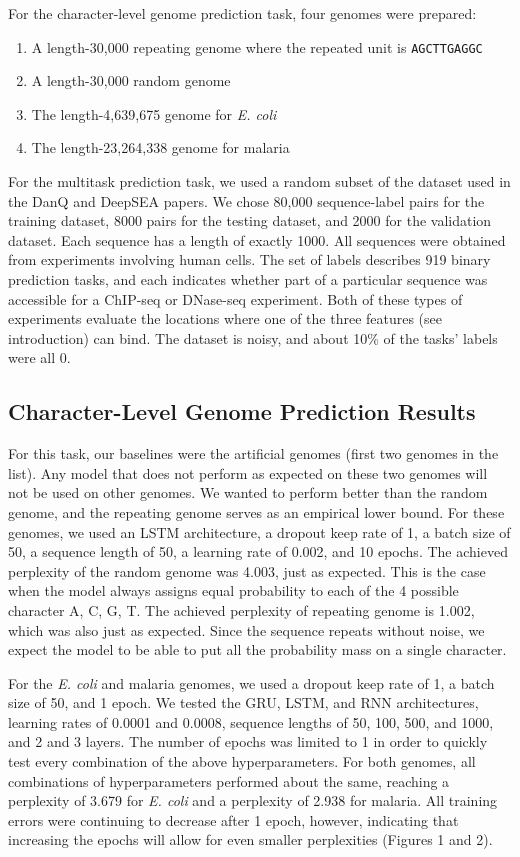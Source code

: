 \documentclass{article} %
\begin{document}
For the character-level genome prediction task, four genomes were prepared:
\begin{enumerate}
	\item A length-30,000 repeating genome where the repeated unit is \texttt{AGCTTGAGGC}
	\item A length-30,000 random genome
	\item The length-4,639,675 genome for \textit{E. coli}
	\item The length-23,264,338 genome for malaria
\end{enumerate}

For the multitask prediction task, we used a random subset of the dataset used in the DanQ \cite{quang2015danq} and DeepSEA \cite{zhou2015predicting} papers. We chose 80,000 sequence-label pairs for the training dataset, 8000 pairs for the testing dataset, and 2000 for the validation dataset. Each sequence has a length of exactly 1000. All sequences were obtained from experiments involving human cells. The set of labels describes 919 binary prediction tasks, and each indicates whether part of a particular sequence was accessible for a ChIP-seq or DNase-seq experiment. Both of these types of experiments evaluate the locations where one of the three features (see introduction) can bind. The dataset is noisy, and about 10\% of the tasks' labels were all 0.

\subsection{Character-Level Genome Prediction Results}

For this task, our baselines were the artificial genomes (first two genomes in the list). Any model that does not perform as expected on these two genomes will not be used on other genomes. We wanted to perform better than the random genome, and the repeating genome serves as an empirical lower bound. For these genomes, we used an LSTM architecture, a dropout keep rate of 1, a batch size of 50, a sequence length of 50, a learning rate of 0.002, and 10 epochs. The achieved perplexity of the random genome was 4.003, just as expected. This is the case when the model always assigns equal probability to each of the 4 possible character A, C, G, T. The achieved perplexity of repeating genome is 1.002, which was also just as expected. Since the sequence repeats without noise, we expect the model to be able to put all the probability mass on a single character.

For the \textit{E. coli} and malaria genomes, we used a dropout keep rate of 1, a batch size of 50, and 1 epoch. We tested the GRU, LSTM, and RNN architectures, learning rates of 0.0001 and 0.0008, sequence lengths of 50, 100, 500, and 1000, and 2 and 3 layers. The number of epochs was limited to 1 in order to quickly test every combination of the above hyperparameters. For both genomes, all combinations of hyperparameters performed about the same, reaching a perplexity of 3.679 for \textit{E. coli} and a perplexity of 2.938 for malaria. All training errors were continuing to decrease after 1 epoch, however, indicating that increasing the epochs will allow for even smaller perplexities (Figures 1 and 2).
\end{document}
